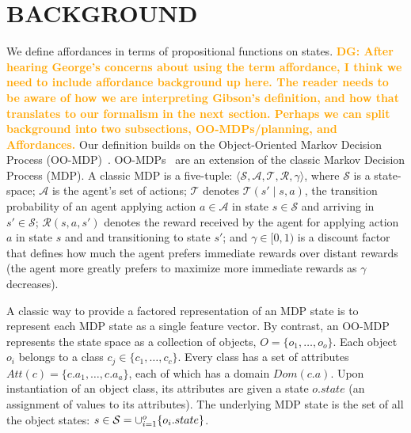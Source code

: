 \documentclass[]{article}
\newcommand{\dgnote}[1]{\textcolor{Orange}{\textbf{DG: #1}}}
\begin{document}


\section{BACKGROUND}

We define affordances in terms of propositional functions on states. \dgnote{After hearing George's concerns about using the term affordance, I think we need to include affordance background up here. The reader needs to be aware of how we are interpreting Gibson's definition, and how that translates to our formalism in the next section. Perhaps we can split background into two subsections, OO-MDPs/planning, and Affordances.}
Our definition builds on the Object-Oriented Markov Decision Process
(OO-MDP)~\citep{diuk08}.  OO-MDPs~\citep{diuk08} are an extension of
the classic Markov Decision Process (MDP).  A classic MDP is a
five-tuple: $\langle \mathcal{S}, \mathcal{A}, \mathcal{T},
\mathcal{R}, \gamma \rangle$, where $\mathcal{S}$ is a state-space;
$\mathcal{A}$ is the agent's set of actions; $\mathcal{T}$ denotes
$\mathcal{T}(s' \mid s,a)$, the transition probability of an agent
applying action $a \in \mathcal{A}$ in state $s \in \mathcal{S}$ and
arriving in $s' \in \mathcal{S}$; $\mathcal{R}(s,a,s')$ denotes the
reward received by the agent for applying action $a$ in state $s$ and
and transitioning to state $s'$; and $\gamma \in [0, 1)$ is a discount
  factor that defines how much the agent prefers immediate rewards
  over distant rewards (the agent more greatly prefers to maximize
  more immediate rewards as $\gamma$ decreases).


A classic way to provide a factored representation of an MDP state is to represent
each MDP state as a single feature vector. By contrast, an OO-MDP represents the state space as a collection of objects,
$O = \{o_1, \ldots, o_o \}$.  Each object $o_i$ belongs to a
class $c_j \in  \{c_1, \ldots, c_c\}$. Every class has a set of attributes
$Att(c) = \{c.a_1, \ldots, c.a_a \}$, each of which has a domain $Dom(c.a)$.
Upon instantiation of an object class, its attributes are given a state $o.state$
(an assignment of values to its attributes).  The underlying MDP state is the set
of all the object states: $s \in {\cal S} = \cup_{i = 1}^o \{o_i.state\}$.
\end{document}
